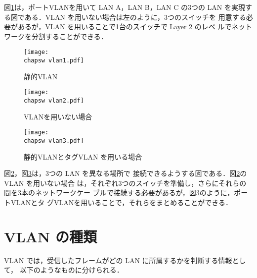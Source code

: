 図\ref{fig:22:static}は，ポートVLANを用いて LAN A，LAN B，LAN C の3つの
LAN を実現する図である．VLAN を用いない場合は左のように，3つのスイッチを
用意する必要があるが，VLAN を用いることで1台のスイッチで Layer 2 のレベ
ルでネットワークを分割することができる．

\begin{figure}[htb]
  \begin{center}
   \texttt{[image: \\chapsw vlan1.pdf]}
   \caption{静的VLAN}
   \label{fig:22:static}
  \end{center}
\end{figure}

\begin{figure}[htb]
  \begin{center}
   \texttt{[image: \\chapsw vlan2.pdf]}
   \caption{VLANを用いない場合}
   \label{fig:22:no-vlan}
  \end{center}
\end{figure}

\begin{figure}[htb]
  \begin{center}
   \texttt{[image: \\chapsw vlan3.pdf]}   
   \caption{静的VLANとタグVLAN を用いる場合}
   \label{fig:22:vlan}
  \end{center}
\end{figure}

図\ref{fig:22:no-vlan}，図\ref{fig:22:vlan}は，3つの LAN を異なる場所で
接続できるようする図である．図\ref{fig:22:no-vlan}の VLAN を用いない場合
は，それぞれ3つのスイッチを準備し，さらにそれらの間を3本のネットワークケー
ブルで接続する必要があるが，図\ref{fig:22:vlan}のように，ポートVLANとタ
グVLANを用いることで，それらをまとめることができる．

\section{VLAN の種類}

VLAN では，受信したフレームがどの LAN に所属するかを判断する情報として，
以下のようなものに分けられる．

